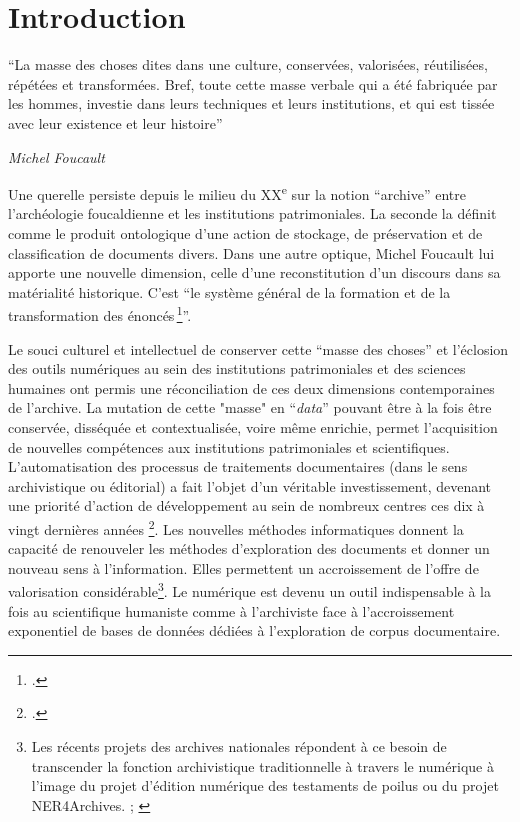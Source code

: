 \chapter{Introduction}

\epigraph{\enquote{La masse des choses dites dans une culture, conservées, valorisées, réutilisées, répétées et transformées. Bref, toute cette masse verbale qui a été fabriquée par les hommes, investie dans leurs techniques et leurs institutions, et qui est tissée avec leur existence et leur histoire}}{\textit{Michel Foucault}\protect\footnotemark}

Une querelle persiste depuis le milieu du XX\textsuperscript{e} sur la notion \enquote{archive} entre l'archéologie foucaldienne et les institutions patrimoniales. La seconde la définit comme le produit ontologique d'une action de stockage, de préservation et de classification de documents divers. Dans une autre optique, Michel Foucault lui apporte une nouvelle dimension, celle d'une reconstitution d'un discours dans sa matérialité historique. C’est \enquote{le système général de la formation et de la transformation des énoncés \footcite[Michel Foucault, L’archéologie du savoir, Paris, Gallimard, 1969, p. 177-179. \textit{via}]{ogilvieParadoxesArchive2017a}}. \par
Le souci culturel et intellectuel de conserver cette \enquote{masse des choses} et l'éclosion des outils numériques au sein des institutions patrimoniales et des sciences humaines ont permis une réconciliation de ces deux dimensions contemporaines de l'archive. La mutation de cette "masse" en \enquote{\textit{data}} pouvant être à la fois être conservée, disséquée et contextualisée, voire même enrichie, permet l'acquisition de nouvelles compétences aux institutions patrimoniales et scientifiques. L'automatisation des processus de traitements documentaires (dans le sens archivistique ou éditorial) a fait l'objet d'un véritable investissement, devenant une priorité d'action de développement au sein de nombreux centres ces dix à vingt dernières années \footcite{MichelFoucaultNumerique2021a}. Les nouvelles méthodes informatiques donnent la capacité de renouveler les méthodes d'exploration des documents et donner un nouveau sens à l'information. Elles permettent un accroissement de l'offre de valorisation considérable\footnote{Les récents projets des archives nationales répondent à ce besoin de transcender la fonction archivistique traditionnelle à travers le numérique à l'image du projet d'édition numérique des testaments de poilus ou du projet NER4Archives. \cite{clavaudVersEditionLigne2019a}; \cite{clavaudNER4ArchivesNamedEntity2022}}. Le numérique est devenu un outil indispensable à la fois au scientifique humaniste comme à l'archiviste face à l'accroissement exponentiel de bases de données dédiées à l'exploration de corpus documentaire.\newpar

